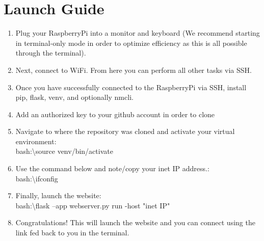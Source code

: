 \documentclass[journal]{IEEEtran}
\newcommand{\MYhref}[3][blue]{\href{#2}{\color{#1}{#3}}}%
\begin{document}
\section{Launch Guide}
\begin{enumerate}

\item Plug your RaspberryPi into a monitor and keyboard (We recommend starting in terminal-only mode in order to optimize efficiency as this is all possible through the terminal).

\item Next, connect to WiFi. From here you can perform all other tasks via SSH.

\item Once you have successfully connected to the RaspberryPi via SSH, install pip, flask, venv, and optionally nmcli.  
\item Add an authorized key to your github account in order to clone \MYhref{https://github.com/Leo-Berman/Treadmill-To-Walking-Pad.git}{this GitHub Repository}

\item Navigate to where the repository was cloned and activate your virtual environment:\\ bash:\textbackslash\textdollar\space source venv/bin/activate

\item Use the command below and note/copy your inet IP address.:\\
bash:\textbackslash\textdollar\space ifconfig


\item Finally, launch the website:\\
bash:\textbackslash\textdollar\space flask --app webserver.py run -host "inet IP"

\item Congratulations! This will launch the website and you can connect using the link fed back to you in the terminal.

\end{enumerate}
\end{document}
